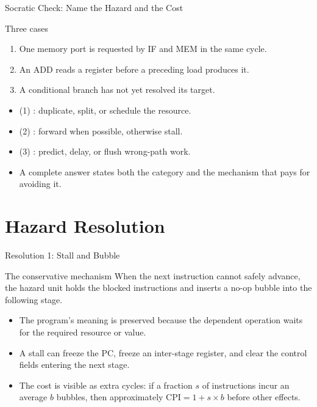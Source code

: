 \documentclass[aspectratio=169]{beamer}
\begin{document}
\begin{frame}{Socratic Check: Name the Hazard and the Cost}
  \begin{alertblock}{Three cases}
    \begin{enumerate}
      \item One memory port is requested by IF and MEM in the same cycle.
      \item An ADD reads a register before a preceding load produces it.
      \item A conditional branch has not yet resolved its target.
    \end{enumerate}
  \end{alertblock}
  \begin{itemize}
    \item (1) : duplicate, split, or schedule the resource.
    \item (2) : forward when possible, otherwise stall.
    \item (3) : predict, delay, or flush wrong-path work.
    \item A complete answer states both the category and the mechanism that
      pays for avoiding it.
  \end{itemize}
\end{frame}


\section{Hazard Resolution}

\begin{frame}{Resolution 1: Stall and Bubble}
  \begin{block}{The conservative mechanism}
    When the next instruction cannot safely advance, the hazard unit holds the
    blocked instructions and inserts a no-op bubble into the following stage.
  \end{block}
  \begin{itemize}
    \item The program's meaning is preserved because the dependent operation
      waits for the required resource or value.
    \item A stall can freeze the PC, freeze an inter-stage register, and clear
      the control fields entering the next stage.
    \item The cost is visible as extra cycles: if a fraction $s$ of instructions
      incur an average $b$ bubbles, then approximately
      $\mathrm{CPI}=1+s\times b$ before other effects.
  \end{itemize}
\end{frame}
\end{document}
